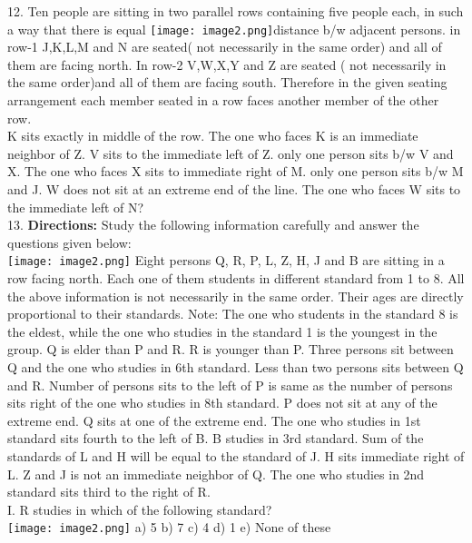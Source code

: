 \documentclass[
]{article}
\begin{document}
12. Ten people are sitting in two parallel rows containing five people each, in such a way that
there is equal \texttt{[image: image2.png]}distance b/w adjacent persons. in row-1 J,K,L,M and N are seated( not
necessarily in the same order) and all of them are facing north. In row-2 V,W,X,Y and Z are
seated ( not necessarily in the same order)and all of them are facing south. Therefore in the
given seating arrangement each member seated in a row faces another member of the other
row.\\
K sits exactly in middle of the row. The one who faces K is an immediate neighbor of Z. V
sits to the immediate left of Z. only one person sits b/w V and X. The one who faces X sits to
immediate right of M. only one person sits b/w M and J. W does not sit at an extreme end of
the line. The one who faces W sits to the immediate left of N?\\

13. \textbf{Directions:} Study the following information carefully and answer the questions given
below:\\
\texttt{[image: image2.png]}
Eight persons Q, R, P, L, Z, H, J and B are sitting in a row facing north. Each one of them
students in different standard from 1 to 8. All the above information is not necessarily in the
same order. Their ages are directly proportional to their standards.
Note: The one who students in the standard 8 is the eldest, while the one who studies in the
standard 1 is the youngest in the group.
Q is elder than P and R. R is younger than P. Three persons sit between Q and the one who
studies in 6th standard. Less than two persons sits between Q and R. Number of persons sits
to the left of P is same as the number of persons sits right of the one who studies in 8th
standard. P does not sit at any of the extreme end. Q sits at one of the extreme end. The one
who studies in 1st standard sits fourth to the left of B. B studies in 3rd standard. Sum of the
standards of L and H will be equal to the standard of J. H sits immediate right of L. Z and J
is not an immediate neighbor of Q. The one who studies in 2nd standard sits third to the
right of R.\\

I. R studies in which of the following standard?\\
\texttt{[image: image2.png]}
a) 5 \hspace{2mm}b) 7 \hspace{2mm}c) 4 \hspace{2mm}d) 1 \hspace{2mm}e) None of these\\
\end{document}
